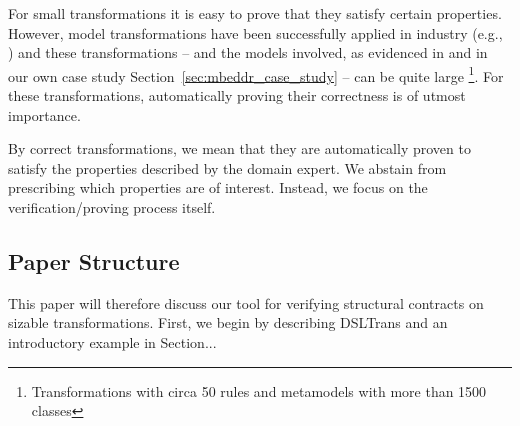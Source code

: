 For small transformations it is easy to prove that they satisfy certain
properties. However, model transformations have been successfully applied in
industry (e.g., \cite{daghsen:hal-00660252,Giese2010}) and these transformations
-- and the models involved, as evidenced in \cite{Selim2012} and in our own case
study Section~\ref{sec:mbeddr_case_study} -- can be quite large
\footnote{Transformations with circa 50 rules and metamodels with more than 1500
classes}.
For these transformations, automatically proving their correctness is of
utmost importance.

By correct transformations, we mean that they are automatically proven to satisfy the properties described by the domain expert. We abstain from prescribing which properties are of interest. Instead, we focus on the verification/proving process itself.

\subsection{Paper Structure}

This paper will therefore discuss our tool for verifying structural contracts on sizable transformations. First, we begin by describing DSLTrans and an introductory example in Section...

